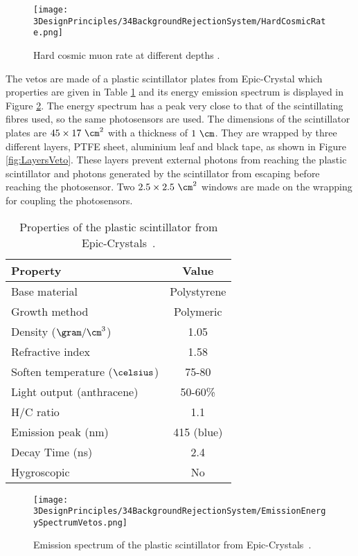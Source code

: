 \begin{figure}[h]
\centering
\texttt{[image: 3DesignPrinciples/34BackgroundRejectionSystem/HardCosmicRate.png]}
\caption{Hard cosmic muon rate at different depths \cite{HardCosmicMuonRatePlot}.\label{fig:HardCoscmicRate}}
\end{figure}

The vetos are made of a plastic scintillator plates from Epic-Crystal \cite{ScintillatorVeto} which properties are given in Table \ref{tab:ParametersScintillatorVeto} and its energy emission spectrum is displayed in Figure \ref{fig:EmissionEnergySpectrumVeto}. The energy spectrum has a peak very close to that of the scintillating fibres used, so the same photosensors are used. The dimensions of the scintillator plates are $45 \times 17~\cm^2$ with a thickness of $1~\cm$. They are wrapped by three different layers, PTFE sheet, aluminium leaf and black tape, as shown in Figure \ref{fig:LayersVeto}. These layers prevent external photons from reaching the plastic scintillator and photons generated by the scintillator from escaping before reaching the photosensor. Two $2.5\times 2.5 ~\cm^2$ windows are made on the wrapping for coupling the photosensors.


\begin{table}[htbp]
\centering{}%
\begin{tabular}{lc}
\toprule 
Property & Value \tabularnewline
\midrule
\midrule 
Base material & Polystyrene \tabularnewline
Growth method & Polymeric \tabularnewline
Density ($\gram/\cm^3$)& 1.05 \tabularnewline
Refractive index & 1.58 \tabularnewline
Soften temperature ($\celsius$) & 75-80 \tabularnewline
Light output (anthracene) & 50-60\% \tabularnewline
H/C ratio & 1.1 \tabularnewline
Emission peak (nm) & 415 (blue) \tabularnewline
Decay Time (ns) & 2.4 \tabularnewline
Hygroscopic & No \tabularnewline
\bottomrule
\end{tabular}
\caption{Properties of the plastic scintillator from Epic-Crystals~\cite{ScintillatorVeto}.}
\label{tab:ParametersScintillatorVeto}
\end{table}

\begin{figure}[]
\centering
\texttt{[image: 3DesignPrinciples/34BackgroundRejectionSystem/EmissionEnergySpectrumVetos.png]}
\caption{Emission spectrum of the plastic scintillator from \newline Epic-Crystals\label{fig:EmissionEnergySpectrumVeto}~\cite{ScintillatorVeto}.}
\end{figure}

